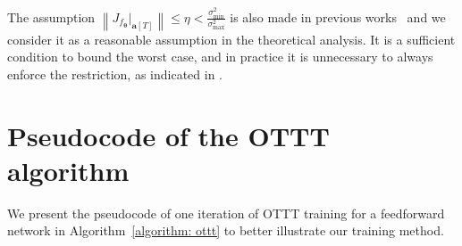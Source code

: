 \documentclass{article}
\begin{document}
\begin{remark}
The assumption $\left\lVert J_{f_{\bm{\theta}}}\vert_{\mathbf{a}[T]} \right\rVert \leq \eta < \frac{\sigma_{\text{min}}^2}{\sigma_{\text{max}}^2}$ is also made in previous works~\cite{fung2021jfb,geng2021training} and we consider it as a reasonable assumption in the theoretical analysis. It is a sufficient condition to bound the worst case, and in practice it is unnecessary to always enforce the restriction, as indicated in \cite{fung2021jfb}.
\end{remark}

\section{Pseudocode of the OTTT algorithm}

We present the pseudocode of one iteration of OTTT training for a feedforward network in Algorithm~\ref{algorithm: ottt} to better illustrate our training method.
\end{document}
